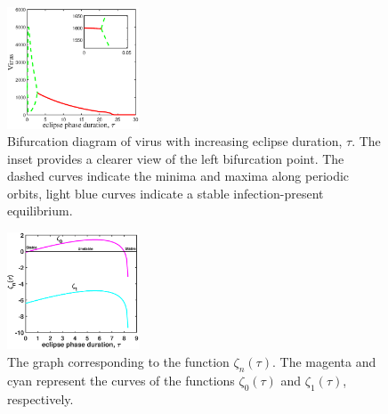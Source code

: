 \documentclass{CMHPhD-SIVD}
\begin{document}
\begin{figure}[h!]
\centering
\includegraphics[height=0.2\textheight,width=0.35\textwidth]{J5.eps}
\vspace{3mm}
\caption{Bifurcation diagram of virus with increasing eclipse duration, $\tau$. The inset provides a clearer view of the left bifurcation point. The dashed curves indicate the minima and maxima along periodic orbits, light blue curves indicate a stable infection-present equilibrium.}
\label{Fig.3}
\end{figure}


\begin{figure}[h!]
\centering
\includegraphics[height=0.2\textheight,width=0.35\textwidth]{F2.eps}
\vspace{3mm}
\caption{The graph corresponding to the function $\zeta_n(\tau)$. The magenta and cyan represent the curves of the functions $\zeta_0(\tau)$ and $\zeta_1(\tau)$, respectively.}
\label{Fig.3b}
\end{figure}
\end{document}
